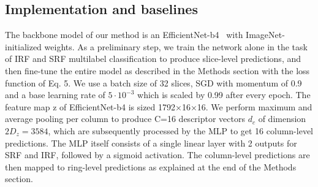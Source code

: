 \subsection{Implementation and baselines}
The backbone model of our method is an EfficientNet-b4~ with ImageNet-initialized weights. As a preliminary step, we train the network alone in the task of IRF and SRF multilabel classification to produce slice-level predictions, and then fine-tune the entire model as described in the Methods section with the loss function of Eq. 5. We use a batch size of 32 slices, SGD with momentum of 0.9 and a base learning rate of $5\cdot10^{-3}$ which is scaled by 0.99 after every epoch. The feature map z of EfficientNet-b4 is sized 1792×16×16. We perform maximum and average pooling per column to produce C=16 descriptor vectors $d_c$ of dimension $2D_z=3584$, which are subsequently processed by the MLP to get 16 column-level predictions. The MLP itself consists of a single linear layer with 2 outputs for SRF and IRF, followed by a sigmoid activation. The column-level predictions are then mapped to ring-level predictions as explained at the end of the Methods section.

